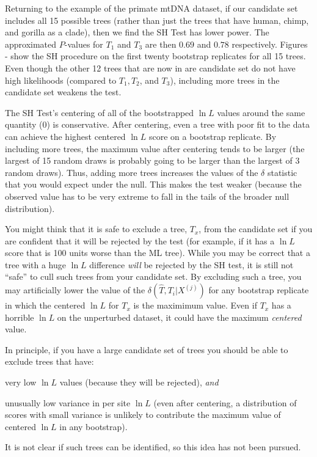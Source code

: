 \documentclass[11pt]{article}
\newcommand{\lnL}{\ln L}
\newcommand{\pvalues}{$P$-values\xspace}
\begin{document}
Returning to the example of the primate mtDNA dataset, if our candidate set includes all 15 possible trees (rather than just the trees that have human, chimp, and gorilla as a clade), then we find the SH Test has lower power.
The approximated \pvalues for $T_1$ and $T_3$ are then $0.69$ and  $0.78$ respectively.
Figures  -  show the SH procedure on the first twenty bootstrap replicates for all 15 trees.
Even though the other 12 trees that are now in are candidate set do not have high likelihoods (compared to $T_1, T_2$, and $T_3$), including more trees in the candidate set weakens the test.


The SH Test's centering of all of the bootstrapped $\lnL$ values around the same quantity (0) is conservative.
After centering, even a tree with poor fit to the data can achieve the highest centered $\lnL$ score on a bootstrap replicate.
By including more trees, the maximum value after centering tends to be larger (the largest of 15 random draws is probably going to be larger than the largest of 3 random draws).
Thus, adding more trees increases the values of the $\delta$ statistic that you would expect under the null. 
This makes the test weaker (because the observed value has to be very extreme to fall in the tails of the broader null distribution).

You might think that it is safe to exclude a tree, $T_x$, from the candidate set if you are confident that it will be rejected by the test (for example, if it has a $\lnL$ score that is 100 units worse than the ML tree).
While you may be correct that a tree with a huge $\lnL$ difference {\em will} be rejected by the SH test, it is still not ``safe'' to cull such trees from your candidate set.
By excluding such a tree, you may artificially lower the value of the $\delta\left(\hat{T}, T_i|X^{(j)}\right)$ for any bootstrap replicate in which the centered $\lnL$ for $T_x$ is the maximimum value. 
Even if $T_x$ has a horrible $\lnL$ on the unperturbed dataset, it could have the maximum {\em centered} value.

In principle, if you have a large candidate set of trees you should be able to exclude trees that have:
\begin{compactenum}
	\item very low $\lnL$ values (because they will be rejected), {\em and}
	\item unusually low variance in per site $\lnL$ (even after centering, a distribution of scores with small variance is unlikely to contribute the maximum value of centered $\lnL$ in any bootstrap).
\end{compactenum}
It is not clear if such trees can be identified, so this idea has not been pursued.
\end{document}

